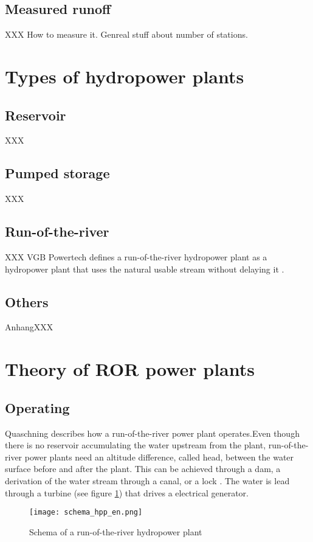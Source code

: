  \subsection{Measured runoff}
 
XXX How to measure it. Genreal stuff about number of stations.
 
 
\section{Types of hydropower plants}
\subsection{Reservoir}
XXX
\subsection{Pumped storage}
XXX
\subsection{Run-of-the-river}
XXX VGB Powertech defines a run-of-the-river hydropower plant as a hydropower plant that uses the natural usable stream without delaying it \cite{vgb}. \newline
\subsection{Others}
AnhangXXX

\section{Theory of ROR power plants}
\subsection{Operating}
Quaschning \cite{quaschning} describes how a run-of-the-river power plant operates.Even though there is no reservoir accumulating the water upstream from the plant, run-of-the-river power plants need an altitude difference, called head, between the water surface before and after the plant. This can be achieved through a dam, a derivation of the water stream through a canal, or a lock \cite{tdi_petites_centrales}. The water is lead through a turbine (see figure \ref{schema_hpp}) that drives a electrical generator.
\begin{figure}[H]
\texttt{[image: schema\_hpp\_en.png]}
\caption[Schema of a run-of-the-river hydropower plant]{Schema of a run-of-the-river hydropower plant \cite{quaschning}}
\centering
\label{schema_hpp}
\end{figure}
